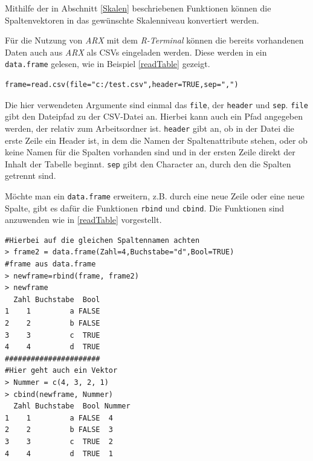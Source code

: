 \documentclass[a4paper, 12pt]{report} %
\begin{document}
Mithilfe der in Abschnitt \ref{Skalen} beschriebenen Funktionen können die Spaltenvektoren in das gewünschte Skalenniveau konvertiert werden.
 
Für die Nutzung von \textit{ARX} mit dem \textit{R-Terminal} können die bereits vorhandenen Daten auch aus \textit{ARX} als CSVs eingeladen werden. 
Diese werden in ein \texttt{data.frame} gelesen, wie in Beispiel \ref{readTable} gezeigt.

\lstset{language=R}
\begin{lstlisting}[frame=single,caption={Einlesen einer Tabelle}]
frame=read.csv(file="c:/test.csv",header=TRUE,sep=",")
\end{lstlisting}
\label{readTable}

Die hier verwendeten Argumente sind einmal das \texttt{file}, der \texttt{header} und \texttt{sep}. \texttt{file} gibt den Dateipfad zu der CSV-Datei an. Hierbei kann auch ein Pfad angegeben werden, der relativ zum Arbeitsordner ist. \texttt{header} gibt an, ob in der Datei die erste Zeile ein Header ist, in dem die Namen der Spaltenattribute stehen, oder ob keine Namen für die Spalten vorhanden sind und in der ersten Zeile direkt der Inhalt der Tabelle beginnt. \texttt{sep} gibt den Character an, durch den die Spalten getrennt sind. 

Möchte man ein \texttt{data.frame} erweitern, z.B. durch eine neue Zeile oder eine neue Spalte, gibt es dafür die Funktionen \texttt{rbind} und \texttt{cbind}. Die Funktionen sind anzuwenden wie in \ref{readTable} vorgestellt. 

\lstset{language=R}
\begin{lstlisting}[frame=single,caption={\texttt{rbind} und \texttt{cbind}}]
#Hierbei auf die gleichen Spaltennamen achten
> frame2 = data.frame(Zahl=4,Buchstabe="d",Bool=TRUE)
#frame aus data.frame
> newframe=rbind(frame, frame2)		
> newframe
  Zahl Buchstabe  Bool
1    1         a FALSE
2    2         b FALSE
3    3         c  TRUE
4    4         d  TRUE
######################
#Hier geht auch ein Vektor
> Nummer = c(4, 3, 2, 1)
> cbind(newframe, Nummer)
  Zahl Buchstabe  Bool Nummer
1    1         a FALSE  4
2    2         b FALSE  3
3    3         c  TRUE  2
4    4         d  TRUE  1

\end{lstlisting}
\label{readTable}

\end{document}
